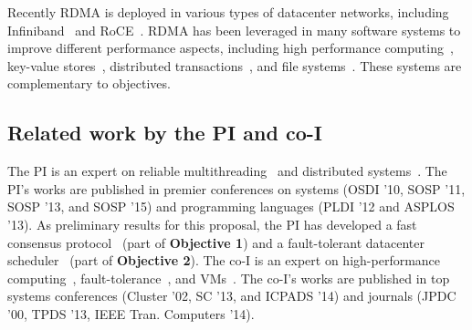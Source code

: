  Recently RDMA is deployed in various types of 
datacenter networks, including Infiniband~\cite{infiniband} and 
RoCE~\cite{roce}. RDMA has been leveraged in many 
software systems to improve different performance aspects, including high 
performance computing~\cite{openmpi}, key-value 
stores~\cite{pilaf:usenix14,herd:sigcomm14,farm:nsdi14,memcached:rdma}, 
distributed transactions~\cite{drtm:sosp15,farm:sosp15}, and file 
systems~\cite{gibson:nfs}. These systems are complementary to \xxx objectives.

\vspace{-.15in}\subsection{Related work by the PI and co-I} 
\label{sec:my-work}\vspace{-.075in}
% 

The PI is an expert on reliable multithreading~\cite{smt:cacm, 
cui:tern:osdi10, peregrine:sosp11, parrot:sosp13} and
distributed systems~\cite{crane:sosp15, 
tripod:apsys16}. The 
PI's works are published in premier conferences on systems (OSDI '10, 
SOSP '11, SOSP '13, and SOSP '15) and programming languages (PLDI '12 and 
ASPLOS '13). As preliminary results for this \xxx proposal, the PI has 
developed a fast consensus protocol~\cite{crane:sosp15} (part of 
\textbf{Objective 1}) and a fault-tolerant datacenter 
scheduler~\cite{tripod:apsys16} (part of \textbf{Objective 2}). The co-I is an 
expert on high-performance 
computing~\cite{powerrock,hwang,jessica,cheung,khokhar}, fault-tolerance~\cite{ 
sheng,shengdi1}, and VMs~\cite{rhymes,shengdi,jessica2}. The 
co-I's works are published in top systems conferences (Cluster '02, SC '13, 
and ICPADS '14) and journals (JPDC '00, TPDS '13, IEEE Tran. Computers '14).



